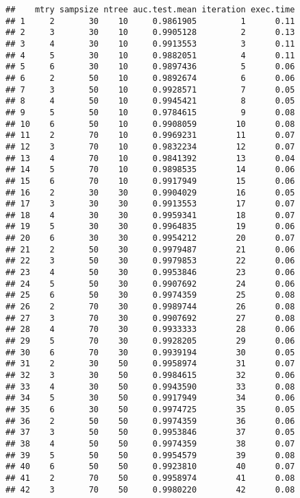 \documentclass[
]{article}
\begin{document}
\begin{verbatim}
##    mtry sampsize ntree auc.test.mean iteration exec.time
## 1     2       30    10     0.9861905         1      0.11
## 2     3       30    10     0.9905128         2      0.13
## 3     4       30    10     0.9913553         3      0.11
## 4     5       30    10     0.9882051         4      0.11
## 5     6       30    10     0.9897436         5      0.06
## 6     2       50    10     0.9892674         6      0.06
## 7     3       50    10     0.9928571         7      0.05
## 8     4       50    10     0.9945421         8      0.05
## 9     5       50    10     0.9784615         9      0.08
## 10    6       50    10     0.9908059        10      0.08
## 11    2       70    10     0.9969231        11      0.07
## 12    3       70    10     0.9832234        12      0.07
## 13    4       70    10     0.9841392        13      0.04
## 14    5       70    10     0.9898535        14      0.06
## 15    6       70    10     0.9917949        15      0.06
## 16    2       30    30     0.9904029        16      0.05
## 17    3       30    30     0.9913553        17      0.07
## 18    4       30    30     0.9959341        18      0.07
## 19    5       30    30     0.9964835        19      0.06
## 20    6       30    30     0.9954212        20      0.07
## 21    2       50    30     0.9979487        21      0.06
## 22    3       50    30     0.9979853        22      0.06
## 23    4       50    30     0.9953846        23      0.06
## 24    5       50    30     0.9907692        24      0.06
## 25    6       50    30     0.9974359        25      0.08
## 26    2       70    30     0.9989744        26      0.08
## 27    3       70    30     0.9907692        27      0.08
## 28    4       70    30     0.9933333        28      0.06
## 29    5       70    30     0.9928205        29      0.06
## 30    6       70    30     0.9939194        30      0.05
## 31    2       30    50     0.9958974        31      0.07
## 32    3       30    50     0.9984615        32      0.06
## 33    4       30    50     0.9943590        33      0.08
## 34    5       30    50     0.9917949        34      0.06
## 35    6       30    50     0.9974725        35      0.05
## 36    2       50    50     0.9974359        36      0.06
## 37    3       50    50     0.9953846        37      0.05
## 38    4       50    50     0.9974359        38      0.07
## 39    5       50    50     0.9954579        39      0.08
## 40    6       50    50     0.9923810        40      0.07
## 41    2       70    50     0.9958974        41      0.08
## 42    3       70    50     0.9980220        42      0.08

\end{verbatim}
\end{document}
